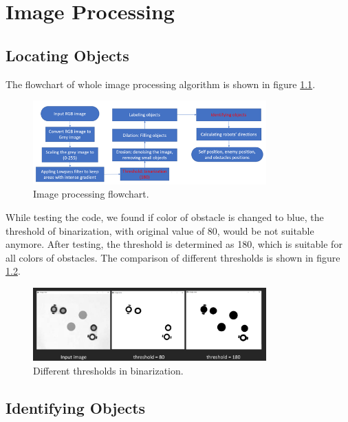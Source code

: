 \chapter{Image Processing}
\label{cha:IP}

\section{Locating Objects}

The flowchart of whole image processing algorithm is shown in figure \ref{IP_flow}.

\begin{figure}[thb]
    \centering
    \includegraphics[width=0.8\textwidth]{images/Image processing flowchart.png}
    \caption[Image processing flowchart]{Image processing flowchart.}\label{IP_flow}
\end{figure}

While testing the code, we found if color of obstacle is changed to blue, the threshold of binarization, with original value of 80, would be not suitable anymore. After testing, the threshold is determined as 180, which is suitable for all colors of obstacles. The comparison of different thresholds is shown in figure \ref{different_threshold}.

\begin{figure}[thb]
    \centering
    \includegraphics[width=0.8\textwidth]{images/different_threshold.png}
    \caption[Different thresholds in binarization]{Different thresholds in binarization.}\label{different_threshold}
\end{figure}

\section{Identifying Objects}


